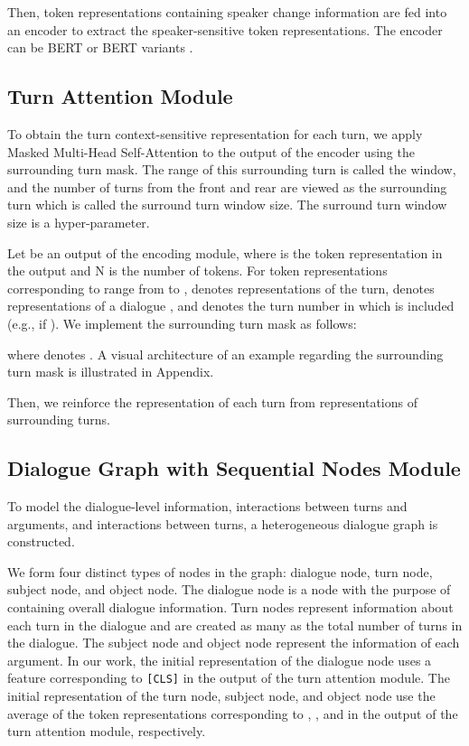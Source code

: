 \documentclass[11pt]{article}
\begin{document}
Then, token representations containing speaker change information are fed into an encoder to extract the speaker-sensitive token representations. The encoder can be BERT or BERT variants \citep{liu2019roberta, NEURIPS2019_c04c19c2, Lan2020ALBERT:}.




\subsection{Turn Attention Module}
\label{ssec:Turn Attention Module}
To obtain the turn context-sensitive representation for each turn, we apply Masked Multi-Head Self-Attention \citep{NIPS2017_3f5ee243} to the output of the encoder using the surrounding turn mask. The range of this surrounding turn is called the window, and the number of turns from the front and rear are viewed as the surrounding turn which is called the surround turn window size. The surround turn window size  is a hyper-parameter.

Let  be an output of the encoding module, where  is the  token representation in the output and N is the number of tokens. For token representations corresponding to  range from  to ,  denotes representations of the  turn,  denotes representations of a dialogue , and  denotes the turn number in which  is included (e.g.,  if ). We implement the surrounding turn mask as follows:

where  denotes . A visual architecture of an example regarding the surrounding turn mask is illustrated in Appendix.

Then, we reinforce the representation of each turn from representations of surrounding turns.



\subsection{Dialogue Graph with Sequential Nodes Module}
\label{ssec:Dialog Graph With Sequential Nodes Module}
To model the dialogue-level information, interactions between turns and arguments, and interactions between turns, a heterogeneous dialogue graph is constructed. 

We form four distinct types of nodes in the graph: dialogue node, turn node, subject node, and object node. The dialogue node is a node with the purpose of containing overall dialogue information. Turn nodes represent information about each turn in the dialogue and are created as many as the total number of turns in the dialogue. The subject node and object node represent the information of each argument. In our work, the initial representation of the dialogue node uses a feature corresponding to \texttt{[CLS]} in the output of the turn attention module. The initial representation of the  turn node, subject node, and object node use the average of the token representations corresponding to \texttt{}, \texttt{}, and \texttt{} in the output of the turn attention module, respectively. 
\end{document}
